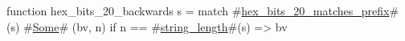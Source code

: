 function hex_bits_20_backwards s =
  match #\hyperref[sailRISCVzhexzybitszy20zymatcheszyprefix]{hex\_bits\_20\_matches\_prefix}#(s) {
      #\hyperref[sailRISCVzSome]{Some}# (bv, n) if n == #\hyperref[sailRISCVzstringzylength]{string\_length}#(s) => bv
  }
